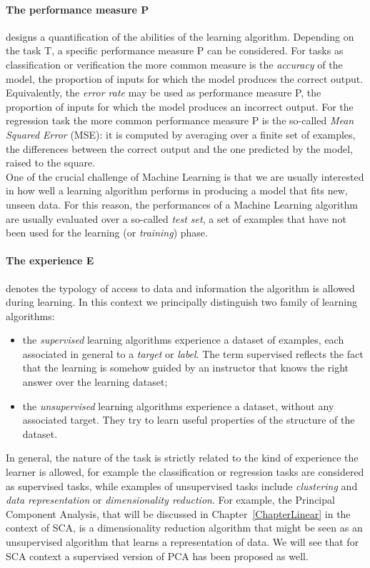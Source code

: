 \paragraph*{The performance measure P} designs a quantification of the abilities of the learning algorithm. Depending on the task T, a specific performance measure P can be considered. For tasks as classification or verification the more common measure is the \emph{accuracy} of the model, \ie the proportion of inputs for which the model produces the correct output. Equivalently, the \emph{error rate} may be used as performance measure P, \ie the proportion of inputs for which the model produces an incorrect output. For the regression task the more common performance measure P is the so-called \emph{Mean Squared Error} (MSE): it is computed by averaging over a finite set of examples, the differences between the correct output and the one predicted by the model,  raised to the square. \\
One of the crucial challenge of Machine Learning is that we are usually interested in how well a learning algorithm performs in producing a model that fits new, unseen data. For this reason, the performances of a Machine Learning algorithm are usually evaluated over a so-called \emph{test set}, \ie a set of examples that have not been used for the learning (or \emph{training}) phase. 

\paragraph*{The experience E} denotes the typology of access to data and information the algorithm is allowed during learning. In this context we principally distinguish two family of learning algorithms: 
\begin{itemize}
\item the \emph{supervised} learning algorithms experience a dataset of examples, each associated in general to a \emph{target} or \emph{label}. The term supervised reflects the fact that the learning is somehow guided by an instructor that knows the right answer over the learning dataset;
\item the \emph{unsupervised} learning algorithms experience a dataset, without any associated target. They try to learn useful properties of the structure of the dataset. 
\end{itemize}
In general, the nature of the task is strictly related to the kind of experience the learner is allowed, for example the classification or regression tasks are considered as supervised tasks, while examples of unsupervised tasks include \emph{clustering} and \emph{data representation} or \emph{dimensionality reduction}. For example, the Principal Component Analysis, that will be discussed in Chapter~\ref{ChapterLinear} in the context of SCA, is a dimensionality reduction algorithm that might be seen as an unsupervised algorithm that learns a representation of data. We will see that for SCA context a supervised version of PCA has been proposed as well. 


